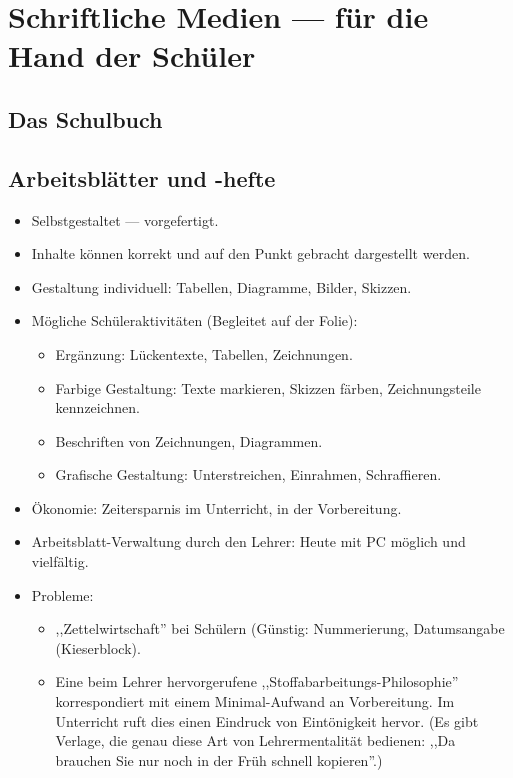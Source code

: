 \bip\bip
\section{Schriftliche Medien --- f\"{u}r die Hand der Sch\"{u}ler}
\subsection{Das Schulbuch}

\subsection{Arbeitsbl\"{a}tter und -hefte}
\begin{itemize}
\item
Selbstgestaltet --- vorgefertigt.
\item
Inhalte k\"{o}nnen korrekt und auf den Punkt gebracht
dargestellt werden.
\item
Gestaltung individuell: Tabellen, Diagramme, Bilder, Skizzen.
\item
M\"{o}gliche Sch\"{u}leraktivit\"{a}ten (Begleitet auf der Folie):
\begin{itemize}
\item
Erg\"{a}nzung: L\"{u}ckentexte, Tabellen, Zeichnungen.
\item
Farbige Gestaltung: Texte markieren, Skizzen f\"{a}rben,
           Zeichnungs\-tei\-le kennzeichnen.
\item
Beschriften von Zeichnungen, Diagrammen.
\item
Grafische Gestaltung: Unterstreichen, Einrahmen, Schraffieren.
\end{itemize}

\item
\"{O}konomie: Zeitersparnis im Unterricht, in der Vorbereitung.
\item
Arbeitsblatt-Verwaltung durch den Lehrer:
Heute mit PC m\"{o}glich und vielf\"{a}ltig.

\item
Probleme:
\begin{itemize}
\item
,,Zettelwirtschaft'' bei Sch\"{u}lern (G\"{u}nstig: Nummerierung, Datumsangabe (Kieserblock).
\item
Eine beim Lehrer hervorgerufene ,,Stoffabarbeitungs-Philosophie''
korrespondiert mit einem Minimal-Aufwand an Vorbereitung.
Im Unterricht ruft dies einen Eindruck von Eint\"{o}nigkeit hervor.
(Es gibt Verlage, die genau diese Art von Lehrermentalit\"{a}t bedienen:
,,Da brauchen Sie nur noch in der Fr\"{u}h schnell kopieren''.)
\end{itemize}
\end{itemize}

